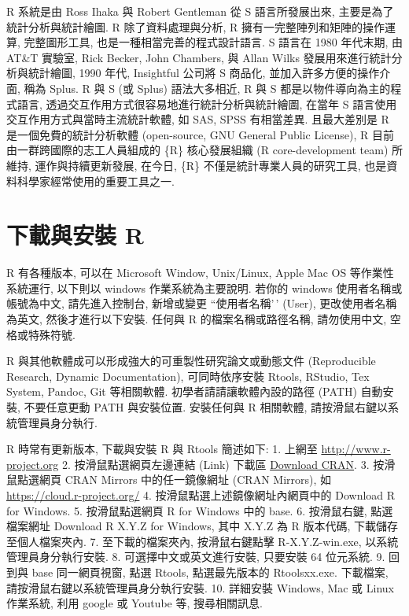 \documentclass[
]{book}
\begin{document}
R 系統是由 Ross Ihaka 與 Robert Gentleman 從 S 語言所發展出來, 主要是為了統計分析與統計繪圖.
R 除了資料處理與分析, R 擁有一完整陣列和矩陣的操作運算, 完整圖形工具, 也是一種相當完善的程式設計語言.
S 語言在 1980 年代末期, 由 AT\&T 實驗室,
Rick Becker, John Chambers, 與 Allan Wilks 發展用來進行統計分析與統計繪圖,
1990 年代, Insightful 公司將 S 商品化,
並加入許多方便的操作介面, 稱為 Splus.
R 與 S (或 Splus) 語法大多相近,
R 與 S 都是以物件導向為主的程式語言,
透過交互作用方式很容易地進行統計分析與統計繪圖,
在當年 S 語言使用交互作用方式與當時主流統計軟體, 如 SAS, SPSS 有相當差異.
且最大差別是 R 是一個免費的統計分析軟體 (open-source, GNU General Public License),
R 目前由一群跨國際的志工人員組成的 \{R\} 核心發展組織 (R core-development team) 所維持, 運作與持續更新發展,
在今日, \{R\} 不僅是統計專業人員的研究工具,
也是資料科學家經常使用的重要工具之一.

\hypertarget{ux4e0bux8f09ux8207ux5b89ux88dd-r}{%
\section{下載與安裝 R}\label{ux4e0bux8f09ux8207ux5b89ux88dd-r}}

R 有各種版本, 可以在 Microsoft Window, Unix/Linux,
Apple Mac OS 等作業性系統運行,
以下則以 windows 作業系統為主要說明.
若你的 windows 使用者名稱或帳號為中文,
請先進入控制台,
新增或變更 ``使用者名稱'\,' (User),
更改使用者名稱為英文,
然後才進行以下安裝.
任何與 R 的檔案名稱或路徑名稱,
請勿使用中文, 空格或特殊符號.

R 與其他軟體成可以形成強大的可重製性研究論文或動態文件
(Reproducible Research, Dynamic Documentation),
可同時依序安裝
Rtools, RStudio, Tex System, Pandoc, Git 等相關軟體.
初學者請請讓軟體內設的路徑 (PATH) 自動安裝,
不要任意更動 PATH 與安裝位置.
安裝任何與 R 相關軟體,
請按滑鼠右鍵以系統管理員身分執行.

R 時常有更新版本, 下載與安裝 R 與 Rtools 簡述如下:
1. 上網至 \url{http://www.r-project.org}
2. 按滑鼠點選網頁左邊連結 (Link) 下載區 \href{https://cran.r-project.org/mirrors.html}{Download CRAN}.
3. 按滑鼠點選網頁 CRAN Mirrors 中的任一鏡像網址 (CRAN Mirrors), 如
\url{https://cloud.r-project.org/}
4. 按滑鼠點選上述鏡像網址內網頁中的 Download R for Windows.
5. 按滑鼠點選網頁 R for Windows 中的 base.
6. 按滑鼠右鍵, 點選檔案網址 Download R X.Y.Z for Windows,
其中 X.Y.Z 為 R 版本代碼, 下載儲存至個人檔案夾內.
7. 至下載的檔案夾內, 按滑鼠右鍵點擊 R-X.Y.Z-win.exe,
以系統管理員身分執行安裝.
8. 可選擇中文或英文進行安裝, 只要安裝 64 位元系統.
9. 回到與 base 同一網頁視窗, 點選 Rtools, 點選最先版本的 Rtoolsxx.exe.
下載檔案, 請按滑鼠右鍵以系統管理員身分執行安裝.
10. 詳細安裝 Windows, Mac 或 Linux 作業系統, 利用 google 或 Youtube 等, 搜尋相關訊息.
\end{document}
